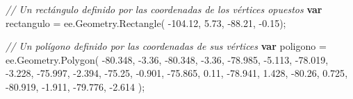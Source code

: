 \documentclass[
  12pt,
  letterpaper,
  twoside]{book}
\newenvironment{Shaded}{\begin{snugshade}}{\end{snugshade}}
\newcommand{\AttributeTok}[1]{\textcolor[rgb]{0.48,0.12,0.64}{#1}}
\newcommand{\CommentTok}[1]{\textcolor[rgb]{0.24,0.58,0.00}{\textit{#1}}}
\newcommand{\ControlFlowTok}[1]{\textcolor[rgb]{0.00,0.00,0.00}{\textbf{#1}}}
\newcommand{\FloatTok}[1]{\textcolor[rgb]{0.28,0.53,0.93}{#1}}
\newcommand{\FunctionTok}[1]{\textcolor[rgb]{0.48,0.12,0.64}{#1}}
\newcommand{\KeywordTok}[1]{\textcolor[rgb]{0.48,0.12,0.64}{#1}}
\newcommand{\NormalTok}[1]{#1}
\newcommand{\OperatorTok}[1]{\textcolor[rgb]{0.00,0.00,0.00}{#1}}
\begin{document}
\begin{Shaded}
\begin{Highlighting}[]
\CommentTok{// Un rectángulo definido por las coordenadas de los vértices opuestos}
\ControlFlowTok{var}\NormalTok{ rectangulo }\OperatorTok{=} \KeywordTok{ee}\OperatorTok{.}\AttributeTok{Geometry}\OperatorTok{.}\FunctionTok{Rectangle}\NormalTok{( }
  \OperatorTok{{-}}\FloatTok{104.12}\OperatorTok{,} \FloatTok{5.73}\OperatorTok{,}
  \OperatorTok{{-}}\FloatTok{88.21}\OperatorTok{,} \OperatorTok{{-}}\FloatTok{0.15}\NormalTok{)}\OperatorTok{;} 

\CommentTok{// Un polígono definido por las coordenadas de sus vértices}
\ControlFlowTok{var}\NormalTok{ poligono }\OperatorTok{=} \KeywordTok{ee}\OperatorTok{.}\AttributeTok{Geometry}\OperatorTok{.}\FunctionTok{Polygon}\NormalTok{( }
  \OperatorTok{{-}}\FloatTok{80.348}\OperatorTok{,} \OperatorTok{{-}}\FloatTok{3.36}\OperatorTok{,}
  \OperatorTok{{-}}\FloatTok{80.348}\OperatorTok{,} \OperatorTok{{-}}\FloatTok{3.36}\OperatorTok{,}
  \OperatorTok{{-}}\FloatTok{78.985}\OperatorTok{,} \OperatorTok{{-}}\FloatTok{5.113}\OperatorTok{,}
  \OperatorTok{{-}}\FloatTok{78.019}\OperatorTok{,} \OperatorTok{{-}}\FloatTok{3.228}\OperatorTok{,}
  \OperatorTok{{-}}\FloatTok{75.997}\OperatorTok{,} \OperatorTok{{-}}\FloatTok{2.394}\OperatorTok{,}
  \OperatorTok{{-}}\FloatTok{75.25}\OperatorTok{,} \OperatorTok{{-}}\FloatTok{0.901}\OperatorTok{,}
  \OperatorTok{{-}}\FloatTok{75.865}\OperatorTok{,} \FloatTok{0.11}\OperatorTok{,}
  \OperatorTok{{-}}\FloatTok{78.941}\OperatorTok{,} \FloatTok{1.428}\OperatorTok{,}
  \OperatorTok{{-}}\FloatTok{80.26}\OperatorTok{,} \FloatTok{0.725}\OperatorTok{,}
  \OperatorTok{{-}}\FloatTok{80.919}\OperatorTok{,} \OperatorTok{{-}}\FloatTok{1.911}\OperatorTok{,}
  \OperatorTok{{-}}\FloatTok{79.776}\OperatorTok{,} \OperatorTok{{-}}\FloatTok{2.614}
\NormalTok{  )}\OperatorTok{;}


\end{Highlighting}
\end{Shaded}
\end{document}
